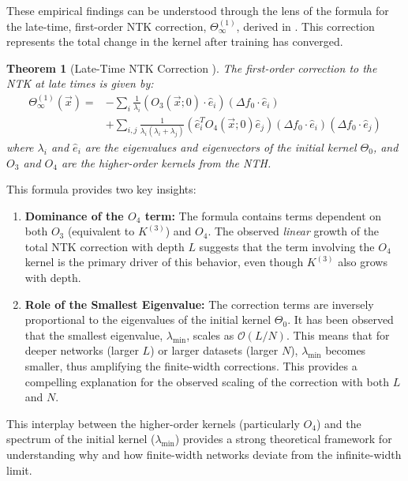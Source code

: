 \documentclass{article}
\newtheorem{theorem}{Theorem}[section]
\begin{document}
These empirical findings can be understood through the lens of the formula for the late-time, first-order NTK correction, $\Theta^{(1)}_\infty$, derived in \cite{large-width-feynman}. This correction represents the total change in the kernel after training has converged.

\begin{theorem}[Late-Time NTK Correction \cite{large-width-feynman}]
The first-order correction to the NTK at late times is given by:
\begin{align}
\Theta^{(1)}_\infty(\vec{x}) = & -\sum_{i}\frac{1}{\lambda_{i}}(O_{3}(\vec{x};0)\cdot\hat{e}_{i})(\Delta f_{0}\cdot\hat{e}_{i}) \nonumber \\
& + \sum_{i,j}\frac{1}{\lambda_{i}(\lambda_{i}+\lambda_{j})}(\hat{e}_{i}^{T}O_{4}(\vec{x};0)\hat{e}_{j})(\Delta f_{0}\cdot \hat{e}_{i})(\Delta f_{0}\cdot \hat{e}_{j})
\label{eq:theta_correction}
\end{align}
where $\lambda_i$ and $\hat{e}_i$ are the eigenvalues and eigenvectors of the initial kernel $\Theta_0$, and $O_3$ and $O_4$ are the higher-order kernels from the NTH.
\end{theorem}

This formula provides two key insights:
\begin{enumerate}
    \item \textbf{Dominance of the $O_4$ term:} The formula contains terms dependent on both $O_3$ (equivalent to $K^{(3)}$) and $O_4$. The observed \textit{linear} growth of the total NTK correction with depth $L$ suggests that the term involving the $O_4$ kernel is the primary driver of this behavior, even though $K^{(3)}$ also grows with depth.

    \item \textbf{Role of the Smallest Eigenvalue:} The correction terms are inversely proportional to the eigenvalues of the initial kernel $\Theta_0$. It has been observed that the smallest eigenvalue, $\lambda_{\min}$, scales as $\mathcal{O}(L/N)$. This means that for deeper networks (larger $L$) or larger datasets (larger $N$), $\lambda_{\min}$ becomes smaller, thus amplifying the finite-width corrections. This provides a compelling explanation for the observed scaling of the correction with both $L$ and $N$.
\end{enumerate}

This interplay between the higher-order kernels (particularly $O_4$) and the spectrum of the initial kernel ($\lambda_{\min}$) provides a strong theoretical framework for understanding why and how finite-width networks deviate from the infinite-width limit.
\end{document}
